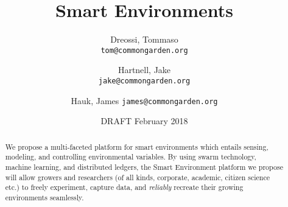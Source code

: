 \documentclass{article}
\title{Smart Environments}
\author{
  Dreossi, Tommaso\\
  \texttt{tom@commongarden.org}
  \and
  Hartnell, Jake\\
  \texttt{jake@commongarden.org}
  \and
  Hauk, James
  \texttt{james@commongarden.org}
}
\date{DRAFT February 2018}
\begin{document}
\maketitle

\begin{abstract}
    We propose a multi-faceted platform for smart environments which entails sensing, modeling, and controlling environmental variables. By using swarm technology, machine learning, and distributed ledgers, the Smart Environment platform we propose will allow growers and researchers (of all kinds, corporate, academic, citizen science etc.) to freely experiment, capture data, and \emph{reliably} recreate their growing environments seamlessly.
\end{abstract}




% 



\end{document}
